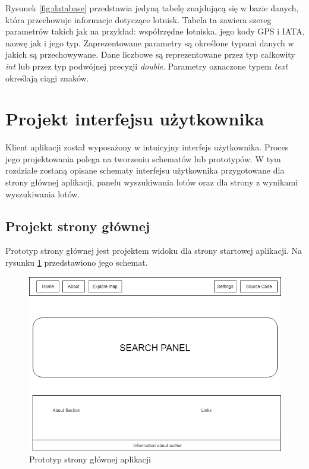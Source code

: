 \documentclass[12pt, twoside]{report}
\begin{document}
\noindent Rysunek \ref{fig:database} przedstawia jedyną tabelę znajdującą się w bazie danych, która przechowuje informacje dotyczące lotnisk. Tabela ta zawiera szereg parametrów takich jak na przykład: współrzędne lotniska, jego kody GPS i IATA, nazwę jak i jego typ. Zaprezentowane parametry są określone typami danych w jakich są przechowywane. Dane liczbowe są reprezentowane przez typ całkowity \textit{int} lub przez typ podwójnej precyzji \textit{double}. Parametry oznaczone typem \textit{text} określają ciągi znaków.

\section{Projekt interfejsu użytkownika}
Klient aplikacji został wyposażony w intuicyjny interfejs użytkownika. Proces jego projektowania polega na tworzeniu schematów lub prototypów. W tym rozdziale zostaną opisane  schematy interfejsu użytkownika przygotowane dla strony głównej aplikacji, panelu wyszukiwania lotów oraz dla strony z wynikami wyszukiwania lotów.
\subsection{Projekt strony głównej}
Prototyp strony głównej jest projektem widoku dla strony startowej aplikacji. Na rysunku \ref{fig:main_page_schema} przedstawiono jego schemat.

\begin{figure}[!ht]
\centering
\includegraphics[scale=0.50, keepaspectratio]{main_page_interface_project.PNG}
\caption{Prototyp strony głównej aplikacji}
\label{fig:main_page_schema}
\end{figure}
\end{document}
